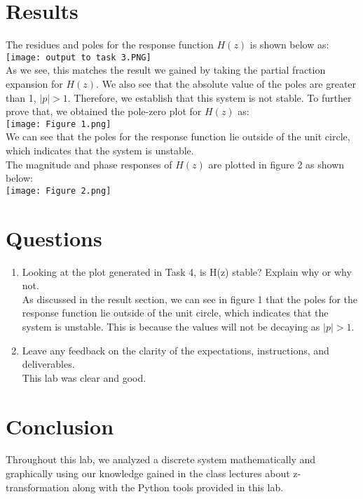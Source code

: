 \documentclass[12pt]{report}
\begin{document}
\section{Results}
The residues and poles for the response function $H(z)$ is shown below as:\\
\texttt{[image: output to task 3.PNG]}\\
As we see, this matches the result we gained by taking the partial fraction expansion for $H(z)$. We also see that the absolute value of the poles are greater than 1, $|p|>1$. Therefore, we establish that this system is not stable. To further prove that, we obtained the pole-zero plot for $H(z)$ as:\\
\texttt{[image: Figure 1.png]}\\
We can see that the poles for the response function lie outside of the unit circle, which indicates that the system is unstable.\\

The magnitude and phase responses of $H(z)$ are plotted in figure 2 as shown below:\\
\texttt{[image: Figure 2.png]}\\

\section{Questions}

\begin{enumerate}
    \item 
    Looking at the plot generated in Task 4, is H(z) stable? Explain why or why not.\\
    As discussed in the result section, we can see in figure 1 that the poles for the response function lie outside of the unit circle, which indicates that the system is unstable. This is because the values will not be decaying as $|p|>1$.\\
    
    \item
    Leave any feedback on the clarity of the expectations, instructions, and deliverables.\\
   This lab was clear and good.
    
\end{enumerate}

\section{Conclusion}
Throughout this lab, we analyzed a discrete system mathematically and graphically using our knowledge gained in the class lectures about z-transformation along with the Python tools provided in this lab.
\end{document}
